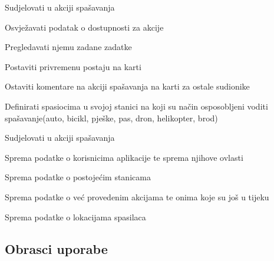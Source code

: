 \begin{packed_enum}
\begin{packed_enum}
				\end{packed_enum}
			
				\item {}
			
				\begin{packed_enum}
					\item Sudjelovati u akciji spašavanja
					\item Osvježavati podatak o dostupnosti za akcije
					\item Pregledavati njemu zadane zadatke
					\item Postaviti privremenu postaju na karti
					\item Ostaviti komentare na akciji spašavanja na karti za ostale sudionike
				\end{packed_enum}
			
				\item {}
			
				\begin{packed_enum}
					\item Definirati spasiocima u svojoj stanici na koji su način osposobljeni voditi spašavanje(auto, bicikl, pješke, pas, dron, helikopter, brod)
					\item Sudjelovati u akciji spašavanja
				\end{packed_enum}
			
				\item {}
			
				\begin{packed_enum}
					\item Sprema podatke o korisnicima aplikacije te sprema njihove ovlasti
					\item Sprema podatke o postojećim stanicama
					\item Sprema podatke o već provedenim akcijama te onima koje su još u tijeku
					\item Sprema podatke o lokacijama spasilaca
				\end{packed_enum}
			\end{packed_enum}
			
			\eject 
			
			
				
			\subsection{Obrasci uporabe\\}

